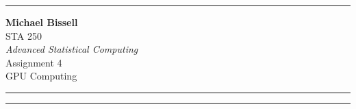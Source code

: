 \documentclass[a4paper, 11pt]{report}
\begin{document}
	\begin{titlepage}
	\vspace*{1.5in}
	\noindent\rule{\textwidth}{1pt}
	\begin{flushright}
		\LARGE \textbf{Michael Bissell} \\ \vspace{0.5in}
		\Large STA 250 \\
		\large \textit{Advanced Statistical Computing} \\ \vspace{0.5in}
		\Large Assignment 4 \\
			GPU Computing
	\end{flushright}
	\noindent\rule{\textwidth}{1pt}
	\end{titlepage}
	\restoregeometry


	

	\noindent\rule{\textwidth}{1pt} \\
	
\end{document}
